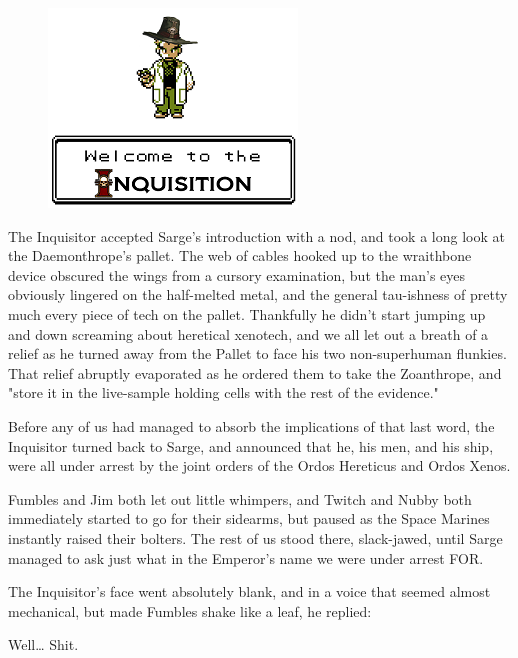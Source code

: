 \begin{figure}
	\begin{center}
		\includegraphics[width=\figwidth]{pics/15/76.png}
	\end{center}
\end{figure}
The Inquisitor accepted Sarge's introduction with a nod, and took a long look at the Daemonthrope's pallet. 
The web of cables hooked up to the wraithbone device obscured the wings from a cursory examination, but the man's eyes obviously lingered on the half-melted metal, and the general tau-ishness of pretty much every piece of tech on the pallet. 
Thankfully he didn't start jumping up and down screaming about heretical xenotech, and we all let out a breath of a relief as he turned away from the Pallet to face his two non-superhuman flunkies. 
That relief abruptly evaporated as he ordered them to take the Zoanthrope, and "store it in the live-sample holding cells with the rest of the evidence."

Before any of us had managed to absorb the implications of that last word, the Inquisitor turned back to Sarge, and announced that he, his men, and his ship, were all under arrest by the joint orders of the Ordos Hereticus and Ordos Xenos. 


Fumbles and Jim both let out little whimpers, and Twitch and Nubby both immediately started to go for their sidearms, but paused as the Space Marines instantly raised their bolters. 
The rest of us stood there, slack-jawed, until Sarge managed to ask just what in the Emperor's name we were under arrest FOR.

The Inquisitor's face went absolutely blank, and in a voice that seemed almost mechanical, but made Fumbles shake like a leaf, he replied:



Well… Shit.

